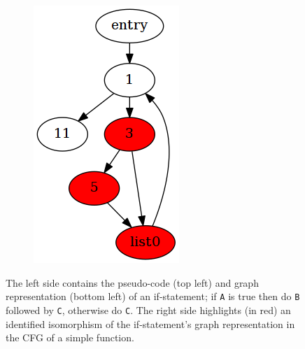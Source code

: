 \begin{figure}[htbp]
\begin{subfigure}[ht]{0.18\textwidth}
		\includegraphics[width=\textwidth]{poster/inc/foo.png}
	\end{subfigure}
	\caption{The left side contains the pseudo-code (top left) and graph representation (bottom left) of an if-statement; if \texttt{A} is true then do \texttt{B} followed by \texttt{C}, otherwise do \texttt{C}. The right side highlights (in red) an identified isomorphism of the if-statement's graph representation in the CFG of a simple function.}
	\label{fig:representation_and_identification_of_primitive}
\end{figure}

